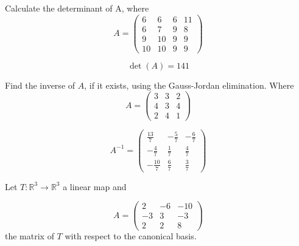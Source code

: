 \begin{questions}

\question Calculate the determinant of A, where
$$
A=\left(\begin{array}{rrrr}
6 & 6 & 6 & 11 \\
6 & 7 & 9 & 8 \\
9 & 10 & 9 & 9 \\
10 & 10 & 9 & 9
\end{array}\right)
$$

\begin{solution}
$$\det(A)=141$$
\end{solution}

\question Find the inverse of $A$, if it exists, using the Gauss-Jordan elimination. Where
$$
A=\left(\begin{array}{rrr}
3 & 3 & 2 \\
4 & 3 & 4 \\
2 & 4 & 1
\end{array}\right)
$$

\begin{solution}
$$A^{-1}=\left(\begin{array}{rrr}
\frac{13}{7} & -\frac{5}{7} & -\frac{6}{7} \\
-\frac{4}{7} & \frac{1}{7} & \frac{4}{7} \\
-\frac{10}{7} & \frac{6}{7} & \frac{3}{7}
\end{array}\right)$$
\end{solution}

\question Let $T:\mathbb{R}^3\rightarrow\mathbb{R}^3$  a linear map and
 
$$
A=\left(\begin{array}{rrr}
2 & -6 & -10 \\
-3 & 3 & -3 \\
2 & 2 & 8
\end{array}\right)
$$
the matrix of $T$ with respect to the canonical basis.
\end{questions}
